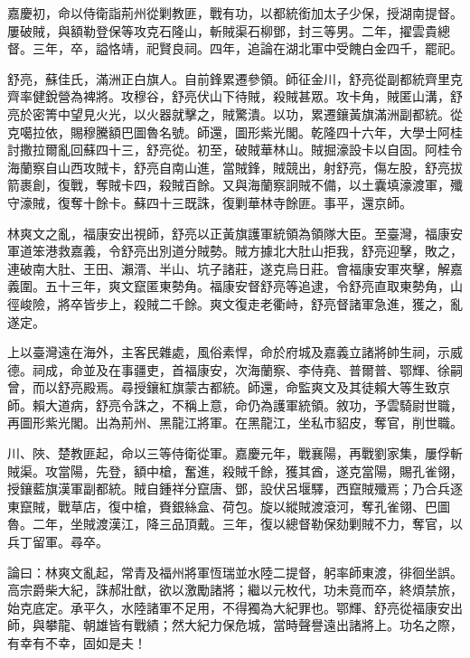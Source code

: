 \begin{pinyinscope}
嘉慶初，命以侍衛詣荊州從剿教匪，戰有功，以都統銜加太子少保，授湖南提督。屢破賊，與額勒登保等攻克石隆山，斬賊渠石柳鄧，封三等男。二年，擢雲貴總督。三年，卒，謚恪靖，祀賢良祠。四年，追論在湖北軍中受餽白金四千，罷祀。

舒亮，蘇佳氏，滿洲正白旗人。自前鋒累遷參領。師征金川，舒亮從副都統齊里克齊率健銳營為裨將。攻穆谷，舒亮伏山下待賊，殺賊甚眾。攻卡角，賊匿山溝，舒亮於密箐中望見火光，以火器就擊之，賊驚潰。以功，累遷鑲黃旗滿洲副都統。從克噶拉依，賜穆騰額巴圖魯名號。師還，圖形紫光閣。乾隆四十六年，大學士阿桂討撒拉爾亂回蘇四十三，舒亮從。初至，破賊華林山。賊掘濠設卡以自固。阿桂令海蘭察自山西攻賊卡，舒亮自南山進，當賊鋒，賊競出，射舒亮，傷左股，舒亮拔箭裹創，復戰，奪賊卡四，殺賊百餘。又與海蘭察詗賊不備，以土囊填濠渡軍，殲守濠賊，復奪十餘卡。蘇四十三既誅，復剿華林寺餘匪。事平，還京師。

林爽文之亂，福康安出視師，舒亮以正黃旗護軍統領為領隊大臣。至臺灣，福康安軍道笨港救嘉義，令舒亮出別道分賊勢。賊方據北大肚山拒我，舒亮迎擊，敗之，連破南大肚、王田、瀨湑、半山、坑子諸莊，遂克烏日莊。會福康安軍夾擊，解嘉義圍。五十三年，爽文竄匿東勢角。福康安督舒亮等追逮，令舒亮直取東勢角，山徑峻險，將卒皆步上，殺賊二千餘。爽文復走老衢峙，舒亮督諸軍急進，獲之，亂遂定。

上以臺灣遠在海外，主客民雜處，風俗素悍，命於府城及嘉義立諸將帥生祠，示威德。祠成，命並及在事疆吏，首福康安，次海蘭察、李侍堯、普爾普、鄂輝、徐嗣曾，而以舒亮殿焉。尋授鑲紅旗蒙古都統。師還，命監爽文及其徒賴大等生致京師。賴大道病，舒亮令誅之，不稱上意，命仍為護軍統領。敘功，予雲騎尉世職，再圖形紫光閣。出為荊州、黑龍江將軍。在黑龍江，坐私市貂皮，奪官，削世職。

川、陜、楚教匪起，命以三等侍衛從軍。嘉慶元年，戰襄陽，再戰劉家集，屢俘斬賊渠。攻當陽，先登，額中槍，奮進，殺賊千餘，獲其酋，遂克當陽，賜孔雀翎，授鑲藍旗漢軍副都統。賊自鍾祥分竄唐、鄧，設伏呂堰驛，西竄賊殲焉；乃合兵逐東竄賊，戰草店，復中槍，賚銀絲盒、荷包。旋以縱賊渡滾河，奪孔雀翎、巴圖魯。二年，坐賊渡漢江，降三品頂戴。三年，復以總督勒保劾剿賊不力，奪官，以兵丁留軍。尋卒。

論曰：林爽文亂起，常青及福州將軍恆瑞並水陸二提督，躬率師東渡，徘徊坐誤。高宗爵柴大紀，誅郝壯猷，欲以激勵諸將；繼以元枚代，功未竟而卒，終煩禁旅，始克底定。承平久，水陸諸軍不足用，不得獨為大紀罪也。鄂輝、舒亮從福康安出師，與攀龍、朝雄皆有戰績；然大紀力保危城，當時聲譽遠出諸將上。功名之際，有幸有不幸，固如是夫！


\end{pinyinscope}
